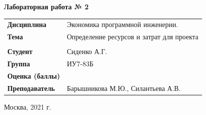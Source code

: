 \documentclass[a4paper,14pt]{extreport} %
\begin{document}
\begin{titlepage}
    \vspace{2cm}

    \begin{center}
        \textbf{Лабораторная работа № 2} \\
        \vspace{0.5cm}
    \end{center}

    \vspace{4cm}

    \begin{flushleft}
        \begin{tabular}{ll}
            \textbf{Дисциплина} & Экономика программной инженерии.  \\
            \textbf{Тема} & Определение ресурсов и затрат для проекта \\
            \\
            \textbf{Студент} & Сиденко А.Г. \\
            \textbf{Группа} & ИУ7-83Б \\
            \textbf{Оценка (баллы)} & \\
            \textbf{Преподаватель} & Барышникова М.Ю., Силантьева А.В.   \\
        \end{tabular}
    \end{flushleft}

    \vspace{4cm}

   \begin{center}
        Москва, 2021 г.
    \end{center}

\end{titlepage}
\end{document}
